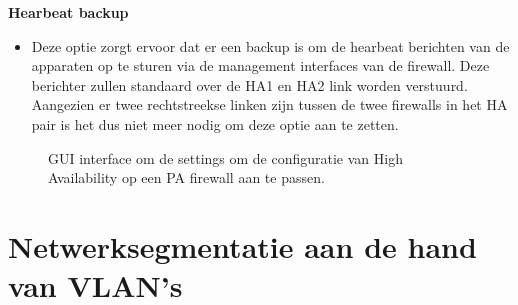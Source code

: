 \textbf{Hearbeat backup}
    \begin{itemize}[label=\textbullet]
        \item Deze optie zorgt ervoor dat er een backup is om de hearbeat berichten van de apparaten op te sturen via de management interfaces van de firewall. Deze berichter zullen standaard over de HA1 en HA2 link worden verstuurd. Aangezien er twee rechtstreekse linken zijn tussen de twee firewalls in het HA pair is het dus niet meer nodig om deze optie aan te zetten.
    \end{itemize}


\begin{figure}[H]
    \centering
    \caption[PA High Availability settings]{\label{fig:grail}GUI interface om de settings om de configuratie van High Availability op een PA firewall aan te passen.}
\end{figure}


\section{Netwerksegmentatie aan de hand van VLAN’s}


